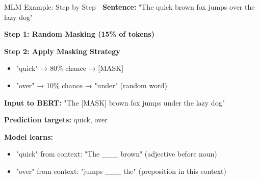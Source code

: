 \documentclass[aspectratio=169]{beamer}
\begin{document}
\begin{frame}[shrink=10]{MLM Example: Step by Step 📝}
\textbf{Sentence:} "The quick brown fox jumps over the lazy dog"

\vspace{1em}

\textbf{Step 1: Random Masking (15\% of tokens)}

\begin{center}
\end{center}

\vspace{1em}

\textbf{Step 2: Apply Masking Strategy}
\begin{itemize}\setlength{\itemsep}{0pt}
    \item "quick" → 80\% chance → [MASK]
    \item "over" → 10\% chance → "under" (random word)
\end{itemize}

\vspace{0.5em}

\textbf{Input to BERT:} "The [MASK] brown fox jumps under the lazy dog"

\textbf{Prediction targets:} quick, over

\vspace{1em}

\textbf{Model learns:}
\begin{itemize}\setlength{\itemsep}{0pt}
    \item "quick" from context: "The \_\_\_ brown" (adjective before noun)
    \item "over" from context: "jumps \_\_\_ the" (preposition in this context)
\end{itemize}
\end{frame}
\end{document}
